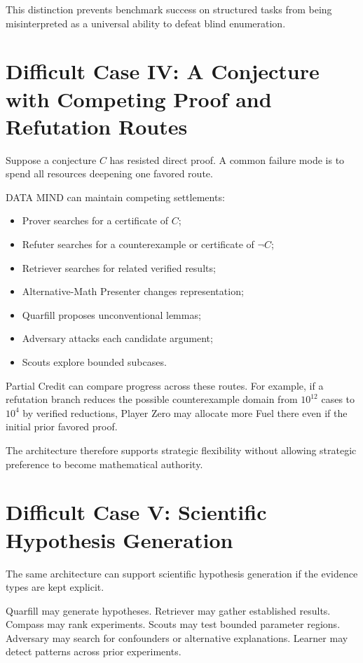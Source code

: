 \documentclass[11pt]{article}
\begin{document}
This distinction prevents benchmark success on structured tasks from being misinterpreted as a universal ability to defeat blind enumeration.

\section{Difficult Case IV: A Conjecture with Competing Proof and Refutation Routes}

Suppose a conjecture $C$ has resisted direct proof. A common failure mode is to spend all resources deepening one favored route.

DATA MIND can maintain competing settlements:
\begin{itemize}
\item Prover searches for a certificate of $C$;
\item Refuter searches for a counterexample or certificate of $\neg C$;
\item Retriever searches for related verified results;
\item Alternative-Math Presenter changes representation;
\item Quarfill proposes unconventional lemmas;
\item Adversary attacks each candidate argument;
\item Scouts explore bounded subcases.
\end{itemize}

Partial Credit can compare progress across these routes. For example, if a refutation branch reduces the possible counterexample domain from $10^{12}$ cases to $10^4$ by verified reductions, Player Zero may allocate more Fuel there even if the initial prior favored proof.

The architecture therefore supports strategic flexibility without allowing strategic preference to become mathematical authority.

\section{Difficult Case V: Scientific Hypothesis Generation}

The same architecture can support scientific hypothesis generation if the evidence types are kept explicit.

Quarfill may generate hypotheses. Retriever may gather established results. Compass may rank experiments. Scouts may test bounded parameter regions. Adversary may search for confounders or alternative explanations. Learner may detect patterns across prior experiments.
\end{document}
